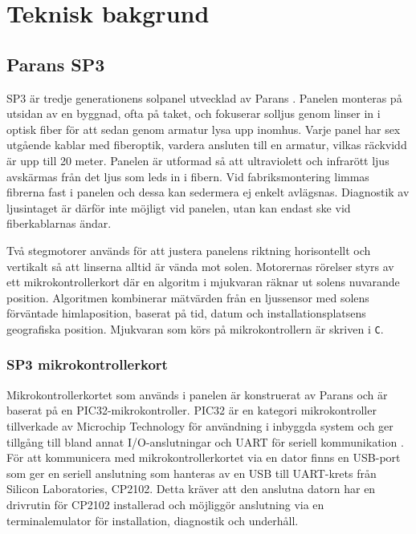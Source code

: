 \section{Teknisk bakgrund} %
\label{sec:teknisk_bakgrund}
    \subsection{Parans SP3} %
    \label{sub:parans_sp3}
        SP3 är tredje generationens solpanel utvecklad av Parans \cite{parans_manual}. Panelen monteras på utsidan av en byggnad, ofta på taket, och fokuserar solljus genom linser in i optisk fiber för att sedan genom armatur lysa upp inomhus. Varje panel har sex utgående kablar med fiberoptik, vardera ansluten till en armatur, vilkas räckvidd är upp till 20 meter. Panelen är utformad så att ultraviolett och infrarött ljus avskärmas från det ljus som leds in i fibern. Vid fabriksmontering limmas fibrerna fast i panelen och dessa kan sedermera ej enkelt avlägsnas. Diagnostik av ljusintaget är därför inte möjligt vid panelen, utan kan endast ske vid fiberkablarnas ändar.\bigskip

        Två stegmotorer används för att justera panelens riktning horisontellt och vertikalt så att linserna alltid är vända mot solen. Motorernas rörelser styrs av ett mikrokontrollerkort där en algoritm i mjukvaran räknar ut solens nuvarande position. Algoritmen kombinerar mätvärden från en ljussensor med solens förväntade himlaposition, baserat på tid, datum och installationsplatsens geografiska position. Mjukvaran som körs på mikrokontrollern är skriven i \texttt{C}.

        \subsubsection{SP3 mikrokontrollerkort} %
        \label{ssub:sp3_mikrokontrollerkort}
            Mikrokontrollerkortet som används i panelen är konstruerat av Parans och är baserat på en PIC32-mikrokontroller. PIC32 är en kategori mikrokontroller tillverkade av Microchip Technology för användning i inbyggda system och ger tillgång till bland annat I/O-anslutningar och UART för seriell kommunikation \cite{PIC32}. För att kommunicera med mikrokontrollerkortet via en dator finns en USB-port som ger en seriell anslutning som hanteras av en USB till UART-krets från Silicon Laboratories, CP2102. Detta kräver att den anslutna datorn har en drivrutin för CP2102 installerad och möjliggör anslutning via en terminalemulator för installation, diagnostik och underhåll.

